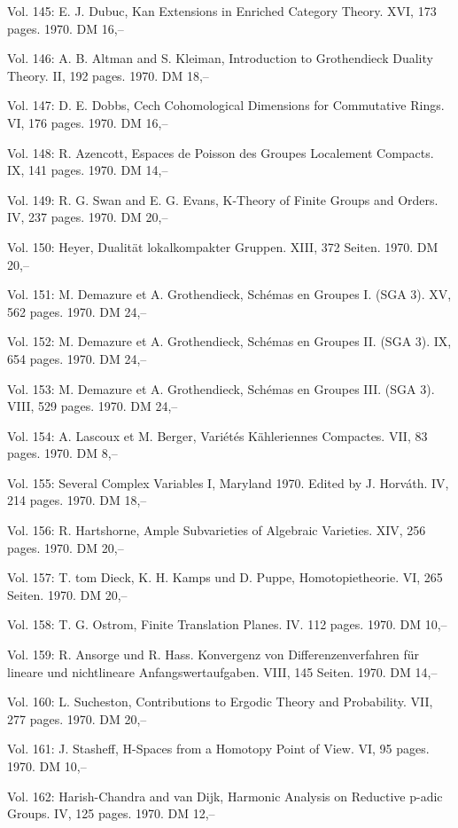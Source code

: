 Vol. 145: E. J. Dubuc, Kan Extensions in Enriched Category Theory. XVI, 173 pages. 1970. DM 16,--

Vol. 146: A. B. Altman and S. Kleiman, Introduction to Grothendieck Duality Theory. II, 192 pages. 1970. DM 18,--

Vol. 147: D. E. Dobbs, Cech Cohomological Dimensions for Commutative Rings. VI, 176 pages. 1970. DM 16,--

Vol. 148: R. Azencott, Espaces de Poisson des Groupes Localement Compacts. IX, 141 pages. 1970. DM 14,--

Vol. 149: R. G. Swan and E. G. Evans, K-Theory of Finite Groups and Orders. IV, 237 pages. 1970. DM 20,--

Vol. 150: Heyer, Dualität lokalkompakter Gruppen. XIII, 372 Seiten. 1970. DM 20,--

Vol. 151: M. Demazure et A. Grothendieck, Schémas en Groupes I. (SGA 3). XV, 562 pages. 1970. DM 24,--

Vol. 152: M. Demazure et A. Grothendieck, Schémas en Groupes II. (SGA 3). IX, 654 pages. 1970. DM 24,--

Vol. 153: M. Demazure et A. Grothendieck, Schémas en Groupes III. (SGA 3). VIII, 529 pages. 1970. DM 24,--

Vol. 154: A. Lascoux et M. Berger, Variétés Kähleriennes Compactes. VII, 83 pages. 1970. DM 8,--

Vol. 155: Several Complex Variables I, Maryland 1970. Edited by J. Horváth. IV, 214 pages. 1970. DM 18,--

Vol. 156: R. Hartshorne, Ample Subvarieties of Algebraic Varieties. XIV, 256 pages. 1970. DM 20,--

Vol. 157: T. tom Dieck, K. H. Kamps und D. Puppe, Homotopietheorie. VI, 265 Seiten. 1970. DM 20,--

Vol. 158: T. G. Ostrom, Finite Translation Planes. IV. 112 pages. 1970. DM 10,--

Vol. 159: R. Ansorge und R. Hass. Konvergenz von Differenzenverfahren für lineare und nichtlineare Anfangswertaufgaben. VIII, 145 Seiten. 1970. DM 14,--

Vol. 160: L. Sucheston, Contributions to Ergodic Theory and Probability. VII, 277 pages. 1970. DM 20,--

Vol. 161: J. Stasheff, H-Spaces from a Homotopy Point of View. VI, 95 pages. 1970. DM 10,--

Vol. 162: Harish-Chandra and van Dijk, Harmonic Analysis on Reductive p-adic Groups. IV, 125 pages. 1970. DM 12,--

